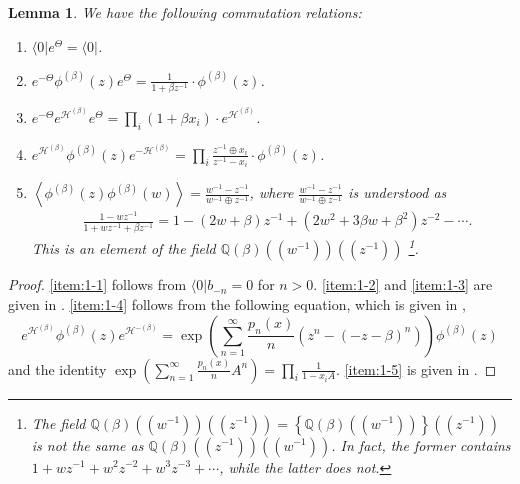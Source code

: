 \documentclass{amsart}
\newtheorem{lemma}[thm]{Lemma}
\def\QQ{\mathord{\mathbb{Q}}}
\def\bra#1{\langle #1 \vert}
\begin{document}
\begin{lemma}\label{lemma:comm_rels_0}
We have the following commutation relations:
\begin{enumerate}
\item\label{item:1-1} $\bra{0}e^{\Theta}=\bra{0}$.
\item\label{item:1-2} $e^{-\Theta}\phi^{(\beta)}(z)e^{\Theta}
=\frac{1}{1+\beta z^{-1}}\cdot \phi^{(\beta)}(z)
$.
\item\label{item:1-3} $e^{-\Theta}e^{\mathcal{H}^{(\beta)}}e^{\Theta}=\prod_{i}(1+\beta x_i)\cdot e^{\mathcal{H}^{(\beta)}}$.
\item\label{item:1-4}
$e^{\mathcal{H}^{(\beta)}}
\phi^{(\beta)}(z)e^{-\mathcal{H}^{(\beta)}}=\prod_{i}\frac{z^{-1}\oplus x_i}{z^{-1}-x_i}\cdot \phi^{(\beta)}(z)$.
\item\label{item:1-5}
$
\left\langle
\phi^{(\beta)}(z)\phi^{(\beta)}(w)
\right\rangle
=\frac{w^{-1}-z^{-1}}{w^{-1}\oplus z^{-1}}
$,
where $\frac{w^{-1}-z^{-1}}{w^{-1}\oplus z^{-1}}$ is understood as 
\[
\begin{aligned}
&%
\textstyle\frac{1-wz^{-1}}{1+wz^{-1}+\beta z^{-1}}=
1-(2w+\beta)z^{-1}+(2w^{2}+3\beta w+\beta^2)z^{-2}-\cdots.
\end{aligned}
\]
This is an element of the field $\QQ(\beta)((w^{-1}))((z^{-1}))$ \footnote{The field $\QQ(\beta)((w^{-1}))((z^{-1}))=\left\{\QQ(\beta)((w^{-1}))\right\}((z^{-1}))$ is not the same as $\QQ(\beta)((z^{-1}))((w^{-1}))$.
In fact, the former contains $1+wz^{-1}+w^2z^{-2}+w^{3}z^{-3}+\cdots$, while the latter does not.
}.
\end{enumerate}
\end{lemma}
\begin{proof}
\eqref{item:1-1} follows from $\bra{0}b_{-n}=0$ for $n>0$.
\eqref{item:1-2} and \eqref{item:1-3} are given in \cite[\S 4.3]{iwao2021neutralfermionic}.
\eqref{item:1-4} follows from the following equation, which is given in \cite[\S 4.2]{iwao2021neutralfermionic},
\[
e^{\mathcal{H}^{(\beta)}}\phi^{(\beta)}(z)e^{\mathcal{H}^{-(\beta)}}
=
\exp\left(\sum_{n=1}^\infty\frac{p_n(x)}{n}(z^n-(-z-\beta)^n)\right)\phi^{(\beta)}(z)
\]
and the identity $\exp\left(\sum_{n=1}^\infty\frac{p_n(x)}{n}A^n\right)=\prod_i\frac{1}{1-x_iA}$.
\eqref{item:1-5} is given in \cite[\S 3.2]{iwao2021neutralfermionic}.
\end{proof}
\end{document}
